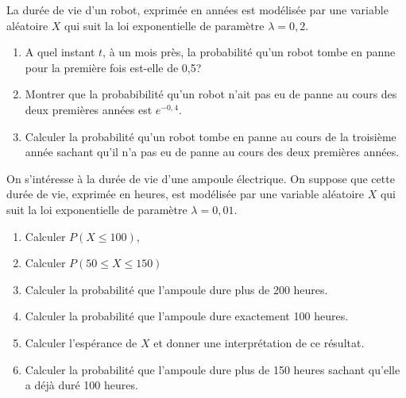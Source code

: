 \def\level{BTS}  %
\def\course{CIEL 2}
\def\chaptername{Lois continues} %
\def\docpart{Loi exponentielle~--~TP3} %
\def\docname{C228}        %

\pagestyle{cours_FP}
\makeheaderBTS{} %


\begin{exercice_cours}[\quad]{}
	La durée de vie d'un robot, exprimée en années est modélisée par une variable aléatoire $X$ qui suit la loi exponentielle de paramètre $\lambda=0,2$.

	\begin{enumerate}
		\item A quel instant $t$, à un mois près, la probabilité qu'un robot tombe en panne pour la première fois est-elle de 0,5?
		\item Montrer que la probabibilité qu'un robot n'ait pas eu de panne au cours des deux premières années est $e^{-0,4}$.
		\item Calculer la probabilité qu'un robot tombe en panne au cours de la troisième année sachant qu'il n'a pas eu de panne au cours des deux premières années.
	\end{enumerate}
\end{exercice_cours}

\begin{exercice_cours}[\quad]{}

On s'intéresse à la durée de vie d'une ampoule électrique. On suppose que cette durée de vie, exprimée en heures, est modélisée par une variable aléatoire $X$ qui suit la loi exponentielle de paramètre $\lambda=0,01$.

\begin{enumerate}
	\item Calculer $P(X\leqslant 100)$, 
	\item Calculer $P(50\leqslant X\leqslant 150)$ 
	\item Calculer la probabilité que l'ampoule dure plus de 200 heures.
	\item Calculer la probabilité que l'ampoule dure exactement 100 heures.
	\item Calculer l'espérance de $X$ et donner une interprétation de ce résultat.	
	\item Calculer la probabilité que l'ampoule dure plus de 150 heures sachant qu'elle a déjà duré 100 heures.
\end{enumerate}
\end{exercice_cours}

